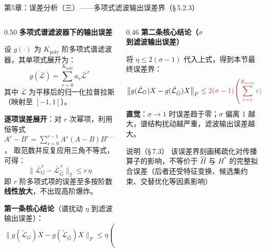 \documentclass[aspectratio=169,9pt,xcolor=dvipsnames]{beamer}
\newcommand{\blue}[1]{\textcolor{mynavy}{#1}}
\begin{document}
\begin{frame}{第5章：误差分析（三）——多项式滤波输出误差界（§\,5.2.3）}
  \begin{columns}[T]
    \begin{column}{0.50\textwidth}
      \textbf{\blue{多项式谱滤波器下的输出误差}}

      设 $g(\cdot)$ 为 $K_{\mathrm{poly}}$ 阶多项式谱滤波器，其单项式展开为：
      \begin{equation*}
        g(\bar{\mathcal{L}}) = \sum_{r=0}^{K_{\mathrm{poly}}} a_r \bar{\mathcal{L}}^{\,r}
      \end{equation*}
      其中 $\bar{\mathcal{L}}$ 为平移后的归一化拉普拉斯（映射至 $[-1,1]$）。

      \vspace{0.15cm}
      \textbf{逐项误差展开}：对 $r$ 次幂项，利用恒等式
      $A^r - B^r = \sum_{s=0}^{r-1}A^s(A-B)B^{r-1-s}$，
      取范数并反复应用三角不等式，可得：
      \begin{equation*}
        \bigl\|\bar{\mathcal{L}}_G^{\,r} - \bar{\mathcal{L}}_{\hat{G}}^{\,r}\bigr\|_2
        \le r\,\eta
      \end{equation*}
      即 $r$ 阶多项式项的误差至多按阶数\textbf{线性放大}，不出现高阶爆炸。

      \vspace{0.15cm}
      \textbf{第一条核心结论}（谱扰动 $\eta$ 到滤波输出误差）：
      \begin{equation*}
        \bigl\|g(\tilde{\mathcal{L}}_G)X - g(\tilde{\mathcal{L}}_{\hat{G}})X\bigr\|_F
        \le \eta\!\left(\sum_{r=1}^{K_{\mathrm{poly}}}r|a_r|\right)\|X\|_F
      \end{equation*}
    \end{column}

    \begin{column}{0.46\textwidth}
      \textbf{\blue{第二条核心结论}（$\sigma$ 到滤波输出误差）}

      将 $\eta\le 2(\sigma-1)$ 代入上式，得到本节最终误差界：
      \begin{equation*}
        \bigl\|g(\tilde{\mathcal{L}}_G)X - g(\tilde{\mathcal{L}}_{\hat{G}})X\bigr\|_F
        \le {\color{myred}2(\sigma-1)\!\left(\sum_{r=1}^{K_{\mathrm{poly}}}r|a_r|\right)\|X\|_F}
      \end{equation*}
      \textbf{直觉}：$\sigma\to 1$ 时误差趋于零；$\sigma$ 偏离 1 越大，谱结构扰动越严重，滤波输出误差越大。

      \vspace{0.2cm}
      \begin{alertblock}{说明（§\,7.3）}
        该误差界刻画稀疏化对传播算子的影响，不等价于 $\hat{H}$ 与 $H^*$ 的完整拟合误差（后者还受特征变换、候选集约束、交替优化等因素影响）
      \end{alertblock}
    \end{column}
  \end{columns}
\end{frame}
\end{document}
